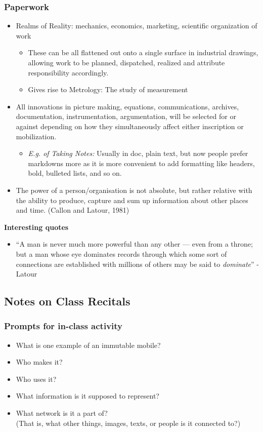 \documentclass[a4paper]{article}
\begin{document}
\subsubsection{Paperwork}
\begin{itemize}
	\item Realms of Reality: mechanics, economics, marketing, scientific organization of work
	\begin{itemize}[label=$\circ$]
		\item These can be all flattened out onto a single surface in industrial drawings, allowing work to be planned, dispatched, realized and attribute responsibility accordingly.
		\item Gives rise to Metrology: The study of measurement
	\end{itemize}
	\item All innovations in picture making, equations, communications, archives, documentation, instrumentation, argumentation, will be selected for or against depending on how they simultaneously affect either inscription or mobilization.
	\begin{itemize}[label=$\circ$]
		\item \textit{E.g. of Taking Notes: }Usually in doc, plain text, but now people prefer markdowns more as it is more convenient to add formatting like headers, bold, bulleted lists, and so on. 
	\end{itemize}
	\item The power of a person/organisation is not absolute, but rather relative with the ability to produce, capture and sum up information about other places and time. (Callon and Latour, 1981)
\end{itemize}
\noindent\textbf{Interesting quotes}
\begin{itemize}
	\item ``A man is never much more powerful than any other --- even from a throne; but a man whose eye dominates records through which some sort of connections are established with millions of others may be said to \textit{dominate}'' - Latour
\end{itemize}
\subsection{Notes on Class Recitals}
\subsubsection{Prompts for in-class activity}
\begin{itemize}
	\item What is one example of an immutable mobile?
	\item Who makes it?
	\item Who uses it?
	\item What information is it supposed to represent?
	\item What network is it a part of?\\(That is, what other things, images, texts, or people is it connected to?)
\end{itemize}
\end{document}

